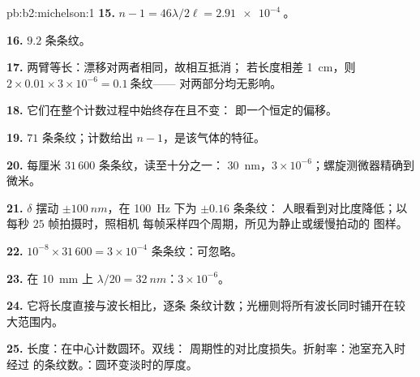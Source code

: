 \begin{solution}{pb:b2:michelson:1}
\textbf{15.} $n - 1 = 46\lambda/2\ell = \qty{2.91e-4}{}$。

\textbf{16.} $9.2$ 条条纹。

\textbf{17.} 两臂等长：漂移对两者相同，故相互抵消；
若长度相差 \qty{1}{cm}，则 $2 \times 0.01 \times 3 \times 10^{-6} = \qty{0.1}{\text{条纹}}$——
对两部分均无影响。

\textbf{18.} 它们在整个计数过程中始终存在且不变：
即一个恒定的偏移。

\textbf{19.} $71$ 条条纹；计数给出 $n - 1$，是该气体的特征。

\textbf{20.} 每厘米 $31\,600$ 条条纹，读至十分之一：
\qty{30}{nm}，$3 \times 10^{-6}$；螺旋测微器精确到微米。

\textbf{21.} $\delta$ 摆动 $\pm\qty{100}{nm}$，在 \qty{100}{Hz} 下为 $\pm0.16$ 条条纹：
人眼看到对比度降低；以每秒 $25$ 帧拍摄时，照相机
每帧采样四个周期，所见为静止或缓慢拍动的
图样。

\textbf{22.} $10^{-8} \times 31\,600 = 3 \times 10^{-4}$ 条条纹：可忽略。

\textbf{23.} 在 \qty{10}{mm} 上 $\lambda/20 = \qty{32}{nm}$：$3 \times 10^{-6}$。

\textbf{24.} 它将长度直接与波长相比，逐条
条纹计数；光栅则将所有波长同时铺开在较大范围内。

\textbf{25.} 长度：在中心计数圆环。双线：
周期性的对比度损失。折射率：池室充入时经过
的条纹数。：圆环变淡时的厚度。
\end{solution}
